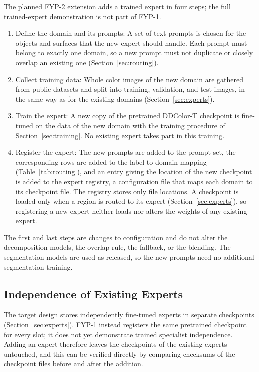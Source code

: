 \documentclass{FastFyp}
\begin{document}
The planned FYP-2 extension adds a trained expert in four steps; the full trained-expert demonstration is not part of FYP-1.

\begin{enumerate}
    \item Define the domain and its prompts: A set of text prompts is chosen for the objects and surfaces that the new expert should handle. Each prompt must belong to exactly one domain, so a new prompt must not duplicate or closely overlap an existing one (Section~\ref{sec:routing}).
    \item Collect training data: Whole color images of the new domain are gathered from public datasets and split into training, validation, and test images, in the same way as for the existing domains (Section~\ref{sec:experts}).
    \item Train the expert: A new copy of the pretrained DDColor-T checkpoint is fine-tuned on the data of the new domain with the training procedure of Section~\ref{sec:training}. No existing expert takes part in this training.
    \item Register the expert: The new prompts are added to the prompt set, the corresponding rows are added to the label-to-domain mapping (Table~\ref{tab:routing}), and an entry giving the location of the new checkpoint is added to the expert registry, a configuration file that maps each domain to its checkpoint file. The registry stores only file locations. A checkpoint is loaded only when a region is routed to its expert (Section~\ref{sec:experts}), so registering a new expert neither loads nor alters the weights of any existing expert.
\end{enumerate}

The first and last steps are changes to configuration and do not alter the decomposition models, the overlap rule, the fallback, or the blending. The segmentation models are used as released, so the new prompts need no additional segmentation training.

\subsection{Independence of Existing Experts}

The target design stores independently fine-tuned experts in separate checkpoints (Section~\ref{sec:experts}). FYP-1 instead registers the same pretrained checkpoint for every slot; it does not yet demonstrate trained specialist independence. Adding an expert therefore leaves the checkpoints of the existing experts untouched, and this can be verified directly by comparing checksums of the checkpoint files before and after the addition.
\end{document}
